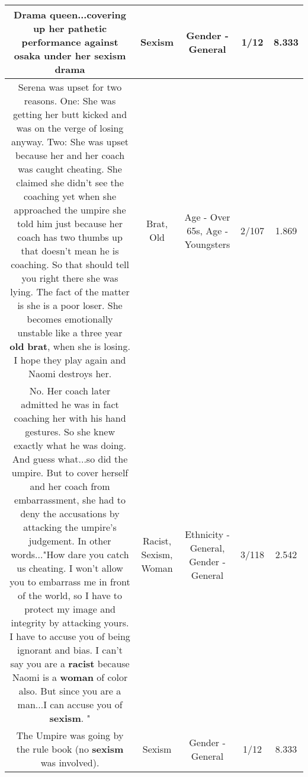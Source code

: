 \documentclass[11pt]{article}
\newlength\mylength
\begin{document}
\begin{center}
\begin{longtable}{|C{.65\mylength}|C{.30\mylength}|C{.12\mylength}|C{.12\mylength}|C{.12\mylength}|}
  \small Drama queen...covering up her pathetic performance against osaka under her \textbf{sexism} drama\normalsize   & Sexism & Gender - General & 1/12 & 8.333 \\  \hline
  \small Serena was upset for two reasons. One: She was getting her butt kicked and was on the verge of losing anyway. Two: She was upset because her and her coach was caught cheating. She claimed she didn't see the coaching yet when she approached the umpire she told him just because her coach has two thumbs up that doesn't mean he is coaching. So that should tell you right there she was lying. The fact of the matter is she is a poor loser. She becomes emotionally unstable like a three year \textbf{old} \textbf{brat}, when she is losing. I hope they play again and Naomi destroys her.\normalsize   & Brat, Old & Age - Over 65s, Age - Youngsters & 2/107 & 1.869 \\  \hline
  \small No. Her coach later admitted he was in fact coaching her with his hand gestures. So she knew exactly what he was doing. And guess what...so did the umpire.  But to cover herself and her coach from embarrassment, she had to deny the accusations by attacking the umpire's judgement.  In other words..."How dare you catch us cheating. I won't allow you to embarrass me in front of the world, so I have to protect my image and integrity by attacking  yours. I have to accuse you of being ignorant and bias. I can't say you are a \textbf{racist} because Naomi is a \textbf{woman} of color also. But since you are a man...I can accuse you of \textbf{sexism}. "\normalsize   & Racist, Sexism, Woman & Ethnicity - General, Gender - General & 3/118 & 2.542 \\  \hline
  \small The Umpire was going by the rule book (no \textbf{sexism} was involved).\normalsize   & Sexism & Gender - General & 1/12 & 8.333 \\  \hline

\end{longtable}
\end{center}
\end{document}

